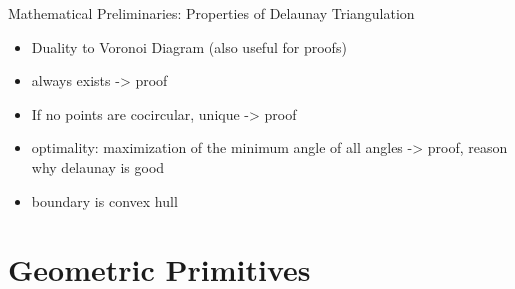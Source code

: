 \documentclass[aspectratio=169,fleqn]{beamer}
\begin{document}
  \begin{frame}{Mathematical Preliminaries: Properties of Delaunay Triangulation}
    \begin{itemize}
      \item Duality to Voronoi Diagram (also useful for proofs)
      \item always exists -> proof
      \item If no points are cocircular, unique -> proof
      \item optimality: maximization of the minimum angle of all angles -> proof, reason why delaunay is good
      \item boundary is convex hull
    \end{itemize}
  \end{frame}

\section{Geometric Primitives}
\end{document}
